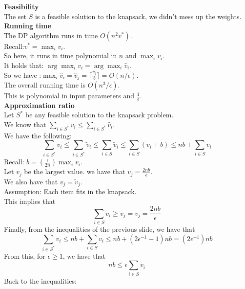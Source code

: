 \documentclass[onecolumn]{report}
\begin{document}
\textbf{Feasibility}\\
The set $S$ is a feasible solution to the knapsack, we didn't mess up the weights.\\
\textbf{Running time}\\
The DP algorithm runs in time $O(n^2v^*)$.\\
Recall:$v^*=\max_i v_i$.\\
So here, it runs in time polynomial in $n$ and $\max_i v_i$.\\
It holds that: $\arg\max_i v_i = \arg\max_i \hat{v}_i$.\\
So we have :$\max_i \hat{v}_i = \hat{v}_j=\lceil \frac{v_j}{b} \rceil =O(n/\epsilon)$.\\
The overall running time is $O(n^3/\epsilon)$.\\
This is polynomial in input parameters and $\frac{1}{\epsilon}$.\\
\textbf{Approximation ratio}\\
Let $S^*$ be any feasible solution to the knapsack problem.\\
We know that $\sum_{i \in S^*} v_i \leq \sum_{i \in S^*} \hat{v}_i$.\\
We have the following:\\
\begin{equation*}
    \sum_{i \in S^*} v_i \leq \sum_{i \in S^*} \tilde{v}_i \leq \sum_{i \in S} \tilde{v}_i \leq \sum_{i \in S} (v_i + b) \leq nb+\sum_{i \in S} v_i
\end{equation*}
Recall: $b=(\frac{\epsilon}{2n})\max_i v_i$.\\
Let $v_j$ be the largest value. we have that $v_j=\frac{2nb}{\epsilon}$.\\
We also have that $v_j=\tilde{v}_j$.\\
Assumption: Each item fits in the knapsack.\\
This implies that
\begin{equation*}
    \sum_{i \in S} \tilde{v}_i \geq \tilde{v}_j = v_j = \frac{2nb}{\epsilon}
\end{equation*}
Finally, from the inequalities of the previous slide, we have that
\begin{equation*}
    \sum_{i \in S^*} v_i \leq nb+\sum_{i \in S} v_i \leq nb+(2\epsilon^{-1}-1)nb=(2\epsilon^{-1})nb
\end{equation*}
From this, for $\epsilon \geq 1$, we have that
\begin{equation*}
    nb \leq \epsilon \sum_{i \in S} v_i
\end{equation*}
Back to the inequalities:
\end{document}
